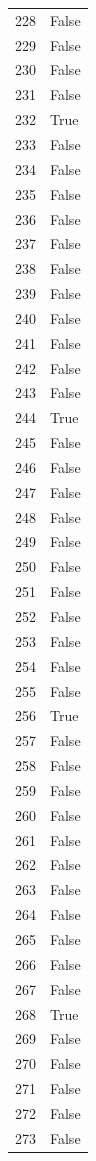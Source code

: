 \documentclass[
  letterpaper,
  DIV=11,
  numbers=noendperiod]{scrreprt}
\begin{document}
\begin{tabular}{ll}
228  &  False \\
229  &  False \\
230  &  False \\
231  &  False \\
232  &   True \\
233  &  False \\
234  &  False \\
235  &  False \\
236  &  False \\
237  &  False \\
238  &  False \\
239  &  False \\
240  &  False \\
241  &  False \\
242  &  False \\
243  &  False \\
244  &   True \\
245  &  False \\
246  &  False \\
247  &  False \\
248  &  False \\
249  &  False \\
250  &  False \\
251  &  False \\
252  &  False \\
253  &  False \\
254  &  False \\
255  &  False \\
256  &   True \\
257  &  False \\
258  &  False \\
259  &  False \\
260  &  False \\
261  &  False \\
262  &  False \\
263  &  False \\
264  &  False \\
265  &  False \\
266  &  False \\
267  &  False \\
268  &   True \\
269  &  False \\
270  &  False \\
271  &  False \\
272  &  False \\
273  &  False \\

\end{tabular}
\end{document}
